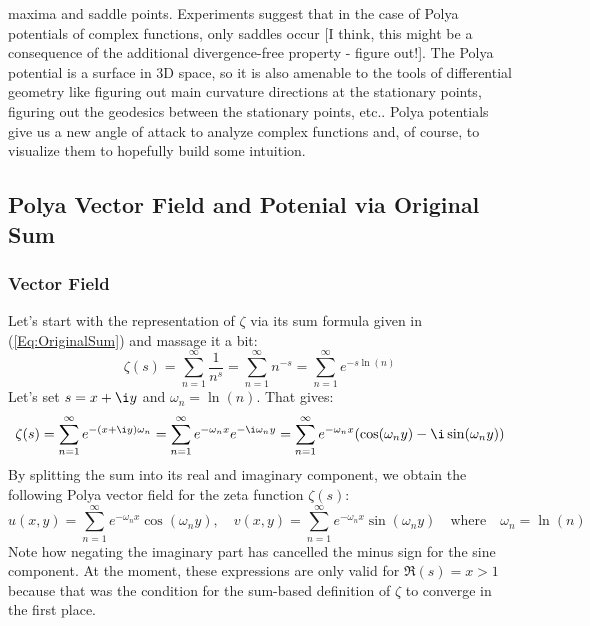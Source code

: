 \documentclass[12pt]{article}
\begin{document}
maxima and saddle points. Experiments suggest that in the case of Polya potentials of complex functions, only saddles occur [I think, this might be a consequence of the additional divergence-free property - figure out!]. The Polya potential is a surface in 3D space, so it is also amenable to the tools of differential geometry like figuring out main curvature directions at the stationary points, figuring out the geodesics between the stationary points, etc.. Polya potentials give us a new angle of attack to analyze complex functions and, of course, to visualize them to hopefully build some intuition.


\subsection{Polya Vector Field and Potenial via Original Sum}

\subsubsection{Vector Field}
Let's start with the representation of $\zeta$ via its sum formula given in (\ref{Eq:OriginalSum}) and massage it a bit:
\begin{equation}
\zeta(s)
= \sum_{n=1}^{\infty} \frac{1}{n^s}
= \sum_{n=1}^{\infty} n^{-s}
= \sum_{n=1}^{\infty} e^{-s \ln(n)}
\end{equation}
Let's set $s = x + \i y$ and $\omega_n = \ln(n)$. That gives:
\begin{equation}
\zeta(s)
= \sum_{n=1}^{\infty} e^{-(x + \i y) \omega_n}
= \sum_{n=1}^{\infty} e^{-\omega_n x} e^{-\i \omega_n y}
= \sum_{n=1}^{\infty} e^{-\omega_n x} (\cos(\omega_n y) - \i \sin (\omega_n y))
\end{equation}
 By splitting the sum into its real and imaginary component, we obtain the following Polya vector field for the zeta function $\zeta(s)$:
\begin{equation}
\label{Eq:PolyaFieldOriginal}	
\boxed{
u(x,y) = \sum_{n=1}^{\infty} e^{-\omega_n x} \cos(\omega_n y), \quad
v(x,y) = \sum_{n=1}^{\infty} e^{-\omega_n x} \sin(\omega_n y) 
}
\quad \text{where} \quad \omega_n = \ln(n) 
\end{equation}
Note how negating the imaginary part has cancelled the minus sign for the sine component. At the moment, these expressions are only valid for $\Re(s) = x > 1$ because that was the condition for the sum-based definition of $\zeta$ to converge in the first place.
\end{document}
